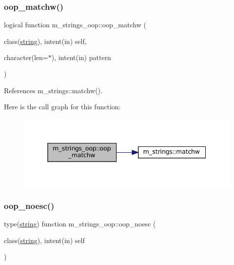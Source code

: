 \mbox{\label{namespacem__strings__oop_ab88f5f814c08f1c93c95fcd0ba2a6779}} 
\subsubsection{\texorpdfstring{oop\+\_\+matchw()}{oop\_matchw()}}
{\footnotesize\ttfamily logical function m\+\_\+strings\+\_\+oop\+::oop\+\_\+matchw (\begin{DoxyParamCaption}\item[{class(\mbox{\hyperlink{structm__strings__oop_1_1string}{string}}), intent(in)}]{self,  }\item[{character(len=$\ast$), intent(in)}]{pattern }\end{DoxyParamCaption})\hspace{0.3cm}{\ttfamily [private]}}



References m\+\_\+strings\+::matchw().

Here is the call graph for this function\+:\nopagebreak
\begin{figure}[H]
\begin{center}
\leavevmode
\includegraphics[width=338pt]{namespacem__strings__oop_ab88f5f814c08f1c93c95fcd0ba2a6779_cgraph}
\end{center}
\end{figure}
\mbox{\label{namespacem__strings__oop_ae1ed148f1ae0694ac093d3e11f9b702b}} 
\subsubsection{\texorpdfstring{oop\+\_\+noesc()}{oop\_noesc()}}
{\footnotesize\ttfamily type(\mbox{\hyperlink{structm__strings__oop_1_1string}{string}}) function m\+\_\+strings\+\_\+oop\+::oop\+\_\+noesc (\begin{DoxyParamCaption}\item[{class(\mbox{\hyperlink{structm__strings__oop_1_1string}{string}}), intent(in)}]{self }\end{DoxyParamCaption})\hspace{0.3cm}{\ttfamily [private]}}

